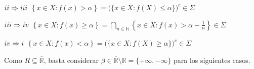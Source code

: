 \documentclass[12pt,a4paper]{article}
\newcommand{\R}{\mathbb{R}}
\newcommand{\N}{\mathbb{N}}
\begin{document}
\vspace{1mm}
\begin{tcolorbox}
    \hspace{-5mm} $\romannumeral 2 \Rightarrow \romannumeral 3$ \hspace{3mm} $\left\{x \in X : f(x) > \alpha \right\} = \Big(\{x \in X : f(X) \leq \alpha\}\Big)^c  \in \Sigma$
\end{tcolorbox}

\vspace{1mm}
\begin{tcolorbox}
   \hspace{-6mm} $\romannumeral 3 \Rightarrow \romannumeral 4$ \hspace{3mm} $\left\{x \in X : f(x) \geq \alpha \right\} = \displaystyle \bigcap_{n \in \N} \left\{x \in X : f(x) > \alpha  - \frac{1}{n}\right\} \in \Sigma$
\end{tcolorbox}

\vspace{1mm}
\begin{tcolorbox}
    \hspace{-4mm} $\romannumeral 4 \Rightarrow \romannumeral 1$ \hspace{3mm} $\left\{x \in X : f(x) < \alpha \right\} = \Big(\{x \in X : f(X) \geq \alpha\}\Big)^c \in \Sigma$
\end{tcolorbox}
\vspace{4mm} \noindent
Como $ R \subseteq\overline{\R}$, basta considerar $\beta \in \overline{\R}\setminus \R = \{+\infty, -\infty\}$ para los siguientes casos.

\end{document}
